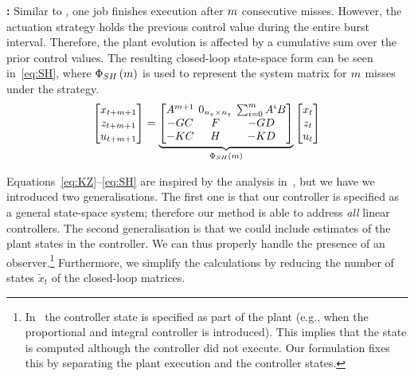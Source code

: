 \textbf{\tSH{}: }%
%
Similar to \tSZ{}, one job finishes execution after $m$ consecutive misses.
However, the actuation strategy holds the previous control value during the entire burst interval.
Therefore, the plant evolution is affected by a cumulative sum over the prior control values.
The resulting closed-loop state-space form can be seen in~\eqref{eq:SH}, where $\Phi{}_{SH}\left( m \right)$ is used to represent the system matrix for $m$ misses under the \tSH{} strategy.
%
\begin{equation}
\setlength\arraycolsep{2pt}
\label{eq:SH}
    \begin{bmatrix}
        x_{t+\nummisses+1} \\
        z_{t+\nummisses+1} \\
        u_{t+\nummisses+1}
    \end{bmatrix} = 
    \underbrace{\begin{bmatrix}
        \Ap^{\nummisses+1}  & 0_{n_x \times n_z}  & \sum_{i=0}^\nummisses \Ap^i\Bp \\
        -\Bc\Cp             & \Ac                                       & -\Bc\Dp \\
        -\Dc\Cp             & \Cc                                       & -\Dc\Dp
    \end{bmatrix}}_{\clmat{}_{SH}\funof{\nummisses}}
    \begin{bmatrix}
        x_{t} \\
        z_{t} \\
        u_{t}
    \end{bmatrix}
\end{equation}

Equations~\eqref{eq:KZ}--\eqref{eq:SH} are inspired by the analysis in~\cite{Maggio:2020}, but we have we introduced two generalisations.
The first one is that our controller is specified as a general state-space system; therefore our method is able to address \emph{all} linear controllers.
The second generalisation is that we could include estimates of the plant states in the controller.
We can thus properly handle the presence of an observer.\footnote{In~\cite{Maggio:2020} the controller state is specified as part of the plant (e.g., when the proportional and integral controller is introduced). This implies that the state is computed although the controller did not execute. Our formulation fixes this by separating the plant execution and the controller states.}
Furthermore, we simplify the calculations by reducing the number of states $\tilde{x}_t$ of the closed-loop matrices.

